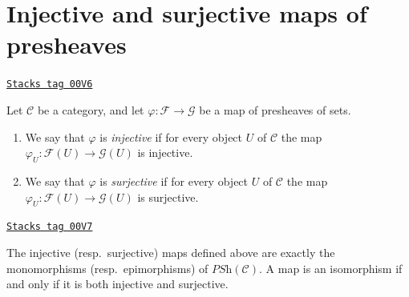 \section{Injective and surjective maps of presheaves}
\label{sites-section-injective-surjective}
\begin{definition}
\label{sites-definition-presheaves-injective-surjective}
\href{https://stacks.math.columbia.edu/tag/00V6}{\texttt{Stacks tag 00V6}}

Let $\mathcal{C}$ be a category, and let $\varphi : \mathcal{F}
\to \mathcal{G}$ be a map of presheaves of sets.
\begin{enumerate}
\item We say that $\varphi$ is {\it injective} if for every object
$U$ of $\mathcal{C}$ the map $\varphi_U : \mathcal{F}(U)
\to \mathcal{G}(U)$ is injective.
\item We say that $\varphi$ is {\it surjective} if for every object
$U$ of $\mathcal{C}$ the map $\varphi_U : \mathcal{F}(U)
\to \mathcal{G}(U)$ is surjective.
\end{enumerate}
\end{definition}

\begin{lemma}
\label{sites-lemma-mono-epi}
\href{https://stacks.math.columbia.edu/tag/00V7}{\texttt{Stacks tag 00V7}}

The injective (resp.\ surjective) maps defined above
are exactly the monomorphisms (resp.\ epimorphisms) of
$\textit{PSh}(\mathcal{C})$. A map is an isomorphism
if and only if it is both injective and surjective.
\end{lemma}

